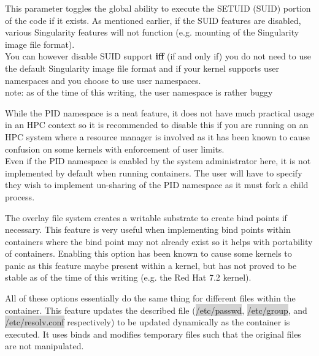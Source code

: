 \documentclass[a4paper]{article}
\newcounter{subsubsubsection}[subsubsection]
\begin{document}

This parameter toggles the global ability to execute the SETUID (SUID) portion of the code if it exists. As mentioned earlier, if the SUID features are disabled, various Singularity features will not function (e.g. mounting of the Singularity image file format).\\[0.1in]

You can however disable SUID support \textbf{iff} (if and only if) you do not need to use the default Singularity image file format and if your kernel supports user namespaces and you choose to use user namespaces.\\[0.1in]

note: as of the time of this writing, the user namespace is rather buggy\\[0.1in]


While the PID namespace is a neat feature, it does not have much practical usage in an HPC context so it is recommended to disable this if you are running on an HPC system where a resource manager is involved as it has been known to cause confusion on some kernels with enforcement of user limits.\\[0.1in]

Even if the PID namespace is enabled by the system administrator here, it is not implemented by default when running containers. The user will have to specify they wish to implement un-sharing of the PID namespace as it must fork a child process.


The overlay file system creates a writable substrate to create bind points if necessary. This feature is very useful when implementing bind points within containers where the bind point may not already exist so it helps with portability of containers. Enabling this option has been known to cause some kernels to panic as this feature maybe present within a kernel, but has not proved to be stable as of the time of this writing (e.g. the Red Hat 7.2 kernel).

All of these options essentially do the same thing for different files within the container. This feature updates the described file (\colorbox{lightgray}{/etc/passwd}, \colorbox{lightgray}{/etc/group}, and \colorbox{lightgray}{/etc/resolv.conf} respectively) to be updated dynamically as the container is executed. It uses binds and modifies temporary files such that the original files are not manipulated.
\end{document}
